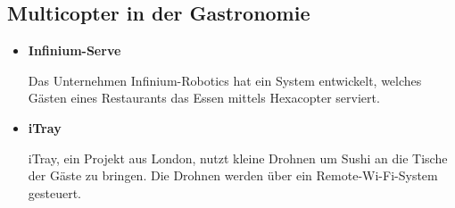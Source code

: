   \subsection*{Multicopter in der Gastronomie}
  \begin{itemize}
      \item \textbf{Infinium-Serve}

      Das Unternehmen Infinium-Robotics hat ein System entwickelt, welches Gästen eines Restaurants
      das Essen mittels Hexacopter serviert.{\cite{infiniumserve}}

      \item \textbf{iTray}

      {iTray\cite{itray}}, ein Projekt aus London, nutzt kleine Drohnen um Sushi an die Tische der Gäste zu bringen.
      Die Drohnen werden über ein Remote-Wi-Fi-System gesteuert.

  \end{itemize}

